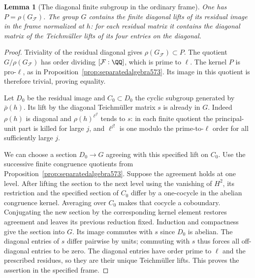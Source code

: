 \documentclass[a4paper,11pt]{article}
\newtheorem{lemma}[proposition]{Lemma}
\theoremstyle{definition}
\theoremstyle{remark}
\numberwithin{equation}{section}
\begin{document}
\begin{lemma}[The diagonal finite subgroup in the ordinary frame]
\leavevmode\label{lem:ordcomplement574}
One has \(P=\rho(G_{\mathcal F})\). The group \(G\) contains
the finite diagonal lifts of its residual image in the
frame normalized at \(h\): for each residual matrix it
contains the diagonal matrix of the Teichm\"uller lifts
of its four entries on the diagonal.
\end{lemma}
\begin{proof}
Triviality of the residual diagonal gives
\(\rho(G_{\mathcal F})\subset P\). The quotient
\(G/\rho(G_{\mathcal F})\) has order dividing
\([\mathcal F:\QQ]\), which is prime to \(\ell\). The
kernel \(P\) is pro-\(\ell\), as in
Proposition~\ref{prop:separatedalgebra573}. Its image in
this quotient is therefore trivial, proving equality.

Let \(D_0\) be the residual image and \(C_0\subset D_0\)
the cyclic subgroup generated by \(\bar\rho(h)\). Its
lift by the diagonal Teichm\"uller matrix \(s\) is already
in \(G\). Indeed \(\rho(h)\) is diagonal and
\(\rho(h)^{\ell^{j!}}\) tends to \(s\): in each finite
quotient the principal-unit part is killed for large \(j\),
and \(\ell^{j!}\) is one modulo the prime-to-\(\ell\)
order for all sufficiently large \(j\).

We can choose a section \(D_0\to G\) agreeing with this
specified lift on \(C_0\). Use the successive finite
congruence quotients from Proposition~\ref{prop:separatedalgebra573}.
Suppose the agreement holds at one level. After lifting the
section to the next level using the vanishing of \(H^2\),
its restriction and the specified section of \(C_0\) differ
by a one-cocycle in the abelian congruence kernel. Averaging
over \(C_0\) makes that cocycle a coboundary. Conjugating the
new section by the corresponding kernel element restores
agreement and leaves its previous reduction fixed. Induction
and compactness give the section into \(G\).
Its image commutes with \(s\) since \(D_0\) is abelian.
The diagonal entries of \(s\) differ pairwise by units;
commuting with \(s\) thus forces all off-diagonal entries
to be zero. The diagonal entries have order prime to \(\ell\)
and the prescribed residues, so they are their unique
Teichm\"uller lifts. This proves the assertion in the
specified frame.
\end{proof}
\end{document}
